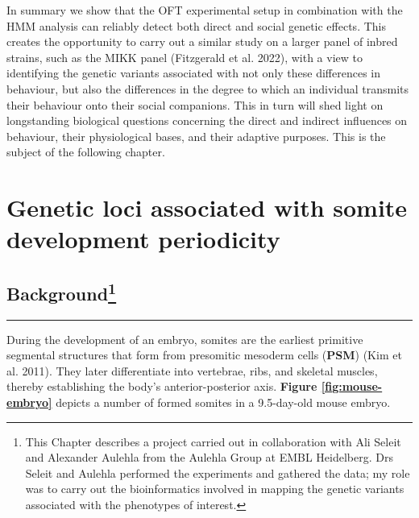 \documentclass[
]{book}
\begin{document}
In summary we show that the OFT experimental setup in combination with the HMM analysis can reliably detect both direct and social genetic effects. This creates the opportunity to carry out a similar study on a larger panel of inbred strains, such as the MIKK panel (Fitzgerald et al. 2022), with a view to identifying the genetic variants associated with not only these differences in behaviour, but also the differences in the degree to which an individual transmits their behaviour onto their social companions. This in turn will shed light on longstanding biological questions concerning the direct and indirect influences on behaviour, their physiological bases, and their adaptive purposes. This is the subject of the following chapter.

\hypertarget{Somite-chap}{%
\chapter{Genetic loci associated with somite development periodicity}\label{Somite-chap}}


\hypertarget{section}{%
\section[\definecolor{chapter_col}{HTML}{3B0023}\textcolor{chapter_col}{Background}]{\texorpdfstring{\textcolor{chapter_col}{Background}\footnote{This Chapter describes a project carried out in collaboration with Ali Seleit and Alexander Aulehla from the Aulehla Group at EMBL Heidelberg. Drs Seleit and Aulehla performed the experiments and gathered the data; my role was to carry out the bioinformatics involved in mapping the genetic variants associated with the phenotypes of interest.}}{}}\label{section}}

\par

\noindent

\rule{\textwidth}{0.4pt}

During the development of an embryo, somites are the earliest primitive segmental structures that form from presomitic mesoderm cells (\textbf{PSM}) (Kim et al. 2011). They later differentiate into vertebrae, ribs, and skeletal muscles, thereby establishing the body's anterior-posterior axis. \textbf{Figure \ref{fig:mouse-embryo}} depicts a number of formed somites in a 9.5-day-old mouse embryo.
\end{document}
